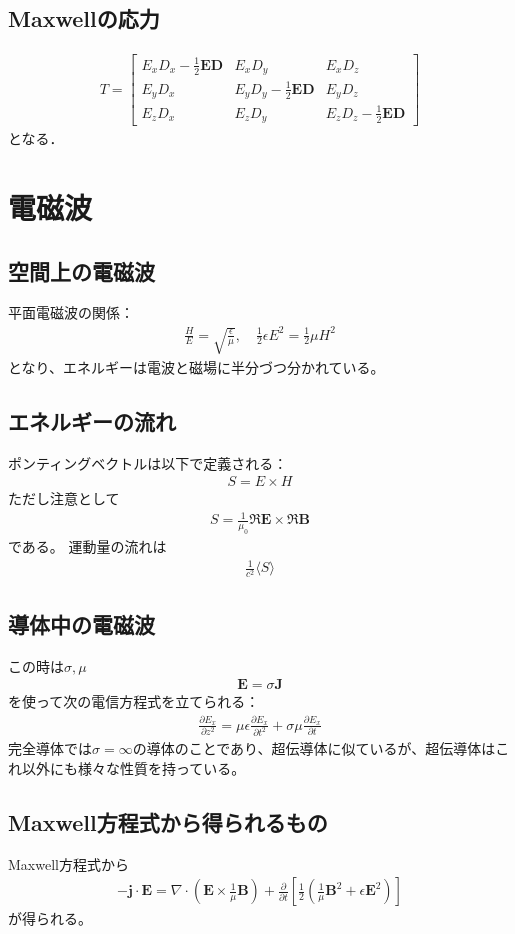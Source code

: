\documentclass[12pt,dvipdfmx]{jsarticle}
\begin{document}
\subsection*{Maxwellの応力}
\begin{eqnarray}
  T = 
  \begin{bmatrix}
    E_x D_x -\frac{1}{2}\bm{E}\bm{D} & E_x D_y & E_x D_z\\
    E_y D_x  & E_y D_y -\frac{1}{2}\bm{E}\bm{D}  & E_y D_z\\
    E_z D_x  & E_z D_y & E_z D_z -\frac{1}{2}\bm{E}\bm{D}
  \end{bmatrix}
\end{eqnarray}
となる．
\section*{\Large{電磁波}}
\subsection*{空間上の電磁波}
平面電磁波の関係：
\begin{eqnarray}
  \frac{H}{E}= \sqrt{\frac{\epsilon}{\mu}},\quad \frac{1}{2}\epsilon E^2 = \frac{1}{2}\mu H^2
\end{eqnarray}
となり、エネルギーは電波と磁場に半分づつ分かれている。
\subsection*{エネルギーの流れ}
ポンティングベクトルは以下で定義される：
\begin{eqnarray}
  S = E\times H
\end{eqnarray}
ただし注意として
\begin{eqnarray}
  S = \frac{1}{\mu_0}\Re\bm{E}\times\Re\bm{B}
\end{eqnarray}
である。
運動量の流れは
\begin{eqnarray}
  \frac{1}{c^2}\langle S \rangle
\end{eqnarray}
\subsection*{導体中の電磁波}
この時は$\sigma,\mu$
\begin{eqnarray}
  \bm{E} = \sigma \bm{J}
\end{eqnarray}
を使って次の電信方程式を立てられる：
\begin{eqnarray}
  \frac{\partial E_x}{\partial z^2} = \mu\epsilon\frac{\partial E_x}{\partial t^2} + \sigma\mu\frac{\partial E_x}{\partial t}
\end{eqnarray}
完全導体では$\sigma=\infty$の導体のことであり、超伝導体に似ているが、超伝導体はこれ以外にも様々な性質を持っている。
\subsection*{Maxwell方程式から得られるもの}
Maxwell方程式から
\begin{eqnarray}
  -\bm{j}\cdot\bm{E} = \nabla\cdot\left(\bm{E}\times\frac{1}{\mu}\bm{B}\right) + \frac{\partial}{\partial t}\left[ \frac{1}{2}\left(\frac{1}{\mu}\bm{B}^2 + \epsilon\bm{E}^2\right) \right]
\end{eqnarray}
が得られる。
\end{document}
